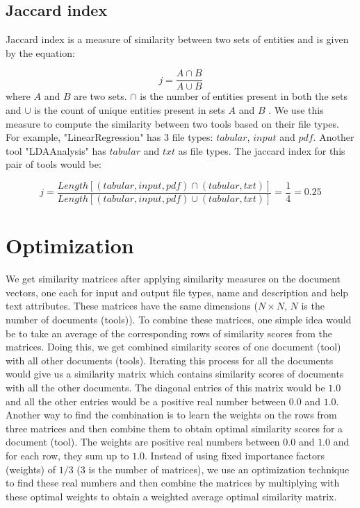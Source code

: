 \subsection{Jaccard index}
Jaccard index is a measure of similarity between two sets of entities and is given by the equation:

\begin{equation}
j = \frac{A \cap B}{A \cup B}
\end{equation}
where $A$ and $B$ are two sets. $\cap$ is the number of entities present in both the sets and $\cup$ is the count of unique entities present in sets $A$ and $B$ \cite{Ivchenko1998}. We use this measure to compute the similarity between two tools based on their file types. For example, "LinearRegression" has 3 file types: $tabular$, $input$ and $pdf$. Another tool "LDAAnalysis" has $tabular$ and $txt$ as file types. The jaccard index for this pair of tools would be:

\begin{equation}
j = \frac{Length[(tabular, input, pdf) \cap (tabular, txt)]}{Length[(tabular, input, pdf) \cup (tabular, txt)]} = \frac{1}{4} = 0.25
\end{equation}

\section{Optimization}
We get similarity matrices after applying similarity measures on the document vectors, one each for input and output file types, name and description and help text attributes. These matrices have the same dimensions ($N \times N$, $N$ is the number of documents (tools)). To combine these matrices, one simple idea would be to take an average of the corresponding rows of similarity scores from the matrices. Doing this, we get combined similarity scores of one document (tool) with all other documents (tools). Iterating this process for all the documents would give us a similarity matrix which contains similarity scores of documents with all the other documents. The diagonal entries of this matrix would be $1.0$ and all the other entries would be a positive real number between $0.0$ and $1.0$. Another way to find the combination is to learn the weights on the rows from three matrices and then combine them to obtain optimal similarity scores for a document (tool). The weights are positive real numbers between $0.0$ and $1.0$ and for each row, they sum up to $1.0$. Instead of using fixed importance factors (weights) of $1/3$ ($3$ is the number of matrices), we use an optimization technique to find these real numbers and then combine the matrices by multiplying with these optimal weights to obtain a weighted average optimal similarity matrix.

